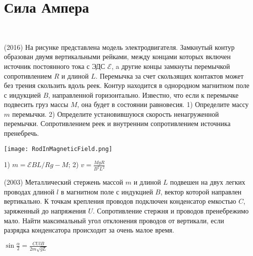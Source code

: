 \section{Сила Ампера}

\begin{ex}
\hspace{0pt} \\
\begin{minipage}{.65\textwidth}
(2016) На рисунке представлена модель электродвигателя. Замкнутый контур образован двумя вертикальными рейками, между концами которых включен источник постоянного тока с ЭДС $\mathcal{E}$, a другие концы замкнуты перемычкой сопротивлением $R$ и длиной $L$. Перемычка за счет скользящих контактов может без трения скользить вдоль реек. Контур находится в однородном магнитном поле с индукцией $B$, направленной горизонтально. Известно, что если к перемычке подвесить груз массы $M$, она будет в состоянии равновесия. 1) Определите массу $m$ перемычки. 2) Определите установившуюся скорость ненагруженной перемычки. Сопротивлением реек и внутренним сопротивлением источника пренебречь.
\end{minipage}
\begin{minipage}{.35\textwidth}
\centering
\texttt{[image: RodInMagneticField.png]}
\end{minipage}

\begin{ans}
1) $m=\mathcal{E}BL/Rg - M$; 2) $v = \frac{MgR}{B^2L^2}$
\end{ans}
\end{ex}

\begin{ex}
(2003) Металлический стержень массой $m$ и длиной $L$ подвешен на двух легких проводах длиной $l$ в магнитном поле с индукцией $B$, 
вектор которой направлен вертикально. К точкам крепления проводов подключен конденсатор емкостью $C$, заряженный до напряжения $U$. 
Сопротивление стержня и проводов пренебрежимо мало. Найти максимальный угол отклонения проводов от вертикали, если разрядка конденсатора происходит за очень малое время.
\begin{ans}
$\sin \frac {\alpha}{2} = \frac{CUlB}{2m \sqrt{gL}}$
\end{ans}
\end{ex}

